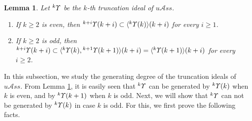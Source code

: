 \documentclass{amsart}
\newtheorem{lem}[thm]{Lemma}
\theoremstyle{definition}
\theoremstyle{remark}
\numberwithin{equation}{section}
\newcommand{\lr}[1]{\langle #1 \rangle}
\newcommand{\ucr}[1]{\underset{#1}{\circ}}
\newcommand{\up}[1]{{^{#1}{\it \!\Upsilon}}}
\def \uas{u\mathcal{A}ss}
\begin{document}

\begin{lem}
\label{yylem3.7}
Let $\up{k}$ be the $k$-th truncation ideal of $\uas$. 
\begin{enumerate}
\item[(1)] 
If $k\geq 2$ is even, then $\up{k+i}(k+i)\subset 
\langle \up{k}(k)\rangle (k+i)$ for every $i\geq 1$.
\item[(2)] 
If $k\geq 2$ is odd, then $\up{k+i}(k+i)\subset 
\langle \up{k}(k), \up{k+1}(k+1) \rangle (k+i)
=\lr{\up{k}(k+1)}(k+i)$ for every $i\geq 2$. 	
\end{enumerate}
\end{lem}

In this subsection, we study the generating degree 
of the truncation ideals of $\uas$. From Lemma 
\ref{yylem3.7}, it is easily seen that $\up{k}$ 
can be generated by $\up{k}(k)$ when $k$ is even,
and by $\up{k}(k+1)$ when $k$ is odd. Next, we 
will show that $\up{k}$ can not be generated by 
$\up{k}(k)$ in case $k$ is odd. For this, we first 
prove the following facts.


%
\end{document}
